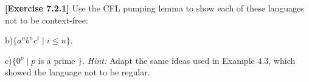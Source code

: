 \textbf{[Exercise 7.2.1]} Use the CFL pumping lemma to show each of 
these languages not to be context-free:

b)$\{a^nb^nc^i\mid i\le n\}$.

c)$\{0^p\mid p$ is a prime $\}$. \textit{Hint:} Adapt the same
ideas used in Example 4.3, which showed the language not to be regular.